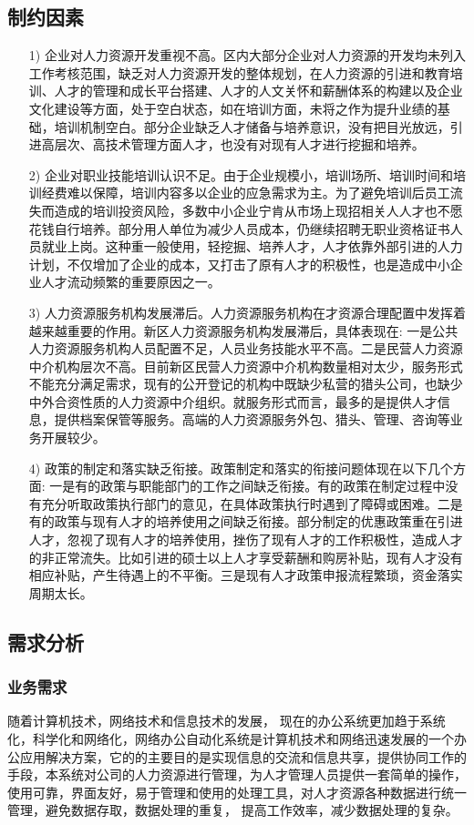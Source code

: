 \documentclass[UTF8]{ctexart}
\begin{document}
\subsection{制约因素}
\begin{itemize}
	\item[1)]
		企业对人力资源开发重视不高。区内大部分企业对人力资源的开发均未列入工作考核范围，缺乏对人力资源开发的整体规划，在人力资源的引进和教育培训、人才的管理和成长平台搭建、人才的人文关怀和薪酬体系的构建以及企业文化建设等方面，处于空白状态，如在培训方面，未将之作为提升业绩的基础，培训机制空白。部分企业缺乏人才储备与培养意识，没有把目光放远，引进高层次、高技术管理方面人才，也没有对现有人才进行挖掘和培养。
	\item[2)]
		企业对职业技能培训认识不足。由于企业规模小，培训场所、培训时间和培训经费难以保障，培训内容多以企业的应急需求为主。为了避免培训后员工流失而造成的培训投资风险，多数中小企业宁肯从市场上现招相关人人才也不愿花钱自行培养。部分用人单位为减少人员成本，仍继续招聘无职业资格证书人员就业上岗。这种重一般使用，轻挖掘、培养人才，人才依靠外部引进的人力计划，不仅增加了企业的成本，又打击了原有人才的积极性，也是造成中小企业人才流动频繁的重要原因之一。
	\item[3)]
		人力资源服务机构发展滞后。人力资源服务机构在才资源合理配置中发挥着越来越重要的作用。新区人力资源服务机构发展滞后，具体表现在: 一是公共人力资源服务机构人员配置不足，人员业务技能水平不高。二是民营人力资源中介机构层次不高。目前新区民营人力资源中介机构数量相对太少，服务形式不能充分满足需求，现有的公开登记的机构中既缺少私营的猎头公司，也缺少中外合资性质的人力资源中介组织。就服务形式而言，最多的是提供人才信息，提供档案保管等服务。高端的人力资源服务外包、猎头、管理、咨询等业务开展较少。
	\item[4)]
		政策的制定和落实缺乏衔接。政策制定和落实的衔接问题体现在以下几个方面: 一是有的政策与职能部门的工作之间缺乏衔接。有的政策在制定过程中没有充分听取政策执行部门的意见，在具体政策执行时遇到了障碍或困难。二是有的政策与现有人才的培养使用之间缺乏衔接。部分制定的优惠政策重在引进人才，忽视了现有人才的培养使用，挫伤了现有人才的工作积极性，造成人才的非正常流失。比如引进的硕士以上人才享受薪酬和购房补贴，现有人才没有相应补贴，产生待遇上的不平衡。三是现有人才政策申报流程繁琐，资金落实周期太长。
\end{itemize}

\subsection{需求分析}
\subsubsection{业务需求}
随着计算机技术，网络技术和信息技术的发展， 现在的办公系统更加趋于系统化，科学化和网络化，网络办公自动化系统是计算机技术和网络迅速发展的一个办公应用解决方案，它的的主要目的是实现信息的交流和信息共享，提供协同工作的手段，本系统对公司的人力资源进行管理，为人才管理人员提供一套简单的操作，使用可靠，界面友好，易于管理和使用的处理工具，对人才资源各种数据进行统一管理，避免数据存取，数据处理的重复， 提高工作效率，减少数据处理的复杂。
\end{document}
